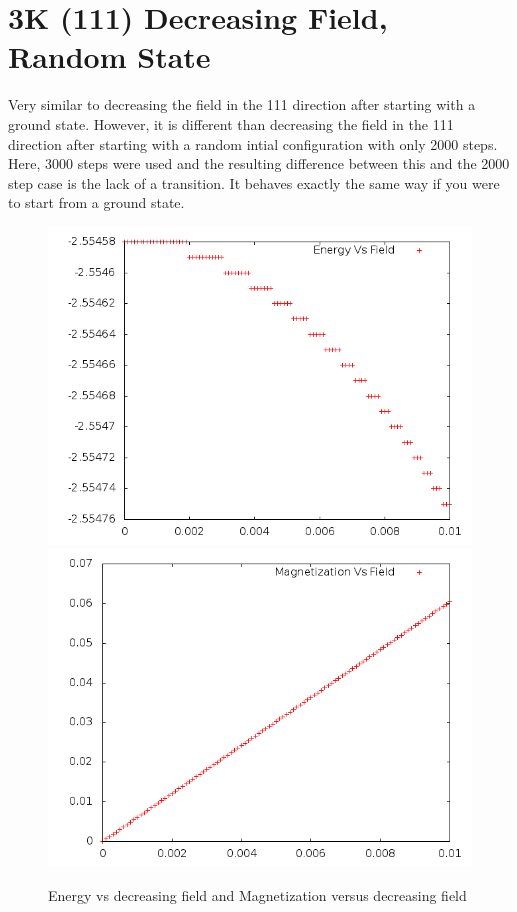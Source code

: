 \documentclass{article}
\begin{document}
\section{3K (111) Decreasing Field, Random State}
Very similar to decreasing the field in the 111 direction after starting with a ground state. However,
it is different than decreasing the field in the 111 direction after starting with a random intial configuration
with only 2000 steps.
Here, 3000 steps were used and the resulting difference between this and the 2000 step case is the lack of a
transition. It behaves exactly the same way if you were to start from a ground state. 
\begin{figure}[ht]
 \centering 
\includegraphics[scale=0.3]{111_3000/E005to000R.png}
\includegraphics[scale=0.3]{111_3000/M005to000R.png}
\caption{Energy vs decreasing field and Magnetization versus decreasing field}
\end{figure}
\end{document}
